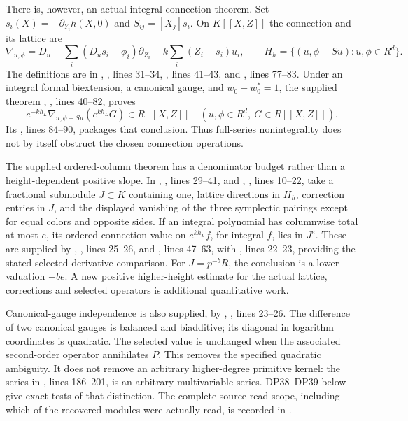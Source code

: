 \documentclass[11pt,a4paper]{article}
\theoremstyle{definition}\newtheorem{remark}[theorem]{Remark}
\begin{document}
There is, however, an actual integral-connection theorem. Set $s_i(X)=-\partial_{Y_i}h(X,0)$ and $S_{ij}=[X_j]s_i$. On $K[[X,Z]]$ the connection and its lattice are
\[
 \nabla_{u,\phi}=D_u+\sum_i(D_us_i+\phi_i)\partial_{Z_i}
       -k\sum_i(Z_i-s_i)u_i,\qquad
 H_h=\{(u,\phi-Su):u,\phi\in R^d\}.
\]
The definitions are in , , lines 31--34, , lines 41--43, and , lines 77--83. Under an integral formal biextension, a canonical gauge, and $w_0+w_0^*=1$, the supplied theorem
,
, lines 40--82, proves
\[
 e^{-kh_L}\nabla_{u,\phi-Su}(e^{kh_L}G)\in R[[X,Z]]
 \quad(u,\phi\in R^d,\ G\in R[[X,Z]]).
\]
Its , lines 84--90, packages that conclusion. Thus full-series nonintegrality does not by itself obstruct the chosen connection operations.

The supplied ordered-column theorem has a denominator budget rather than a height-dependent positive slope. In , , lines 29--41, and , , lines 10--22, take a fractional submodule $J\subset K$ containing one, lattice directions in $H_h$, correction entries in $J$, and the displayed vanishing of the three symplectic pairings except for equal colors and opposite sides. If an integral polynomial has columnwise total  at most $e$, its ordered connection value on $e^{kh_L}f$, for integral $f$, lies in $J^e$. These are supplied by , , lines 25--26, and , lines 47--63, with , lines 22--23, providing the stated selected-derivative comparison. For $J=p^{-b}R$, the conclusion is a lower valuation $-be$. A new positive higher-height estimate for the actual lattice, corrections and selected operators is additional quantitative work.

Canonical-gauge independence is also supplied, by
,
, lines 23--26. The difference of two canonical gauges is balanced and biadditive; its diagonal in logarithm coordinates is quadratic. The selected value is unchanged when the associated second-order operator annihilates $P$. This removes the specified quadratic ambiguity. It does not remove an arbitrary higher-degree primitive kernel: the series  in , lines 186--201, is an arbitrary multivariable series. DP38--DP39 below give exact tests of that distinction. The complete source-read scope, including which of the recovered modules were actually read, is recorded in .
\end{document}
